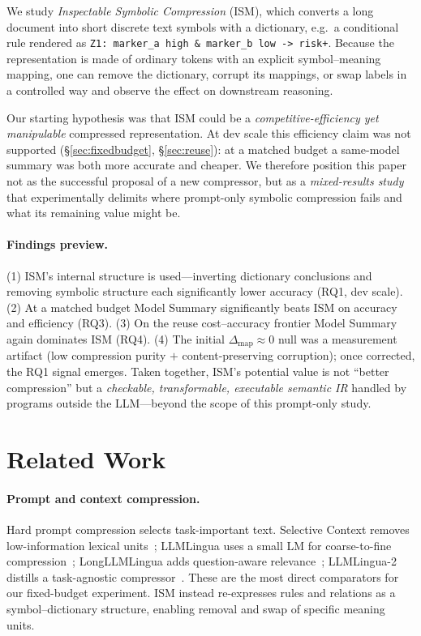 \documentclass{article}
\begin{document}
We study \emph{Inspectable Symbolic Compression} (ISM), which converts a long
document into short discrete text symbols with a dictionary, e.g.\ a conditional
rule rendered as \texttt{Z1: marker\_a high \& marker\_b low -> risk+}. Because
the representation is made of ordinary tokens with an explicit symbol--meaning
mapping, one can remove the dictionary, corrupt its mappings, or swap labels in a
controlled way and observe the effect on downstream reasoning.

Our starting hypothesis was that ISM could be a \emph{competitive-efficiency yet
manipulable} compressed representation. At dev scale this efficiency claim was
not supported (\S\ref{sec:fixedbudget}, \S\ref{sec:reuse}): at a matched budget a
same-model summary was both more accurate and cheaper. We therefore position this
paper not as the successful proposal of a new compressor, but as a
\emph{mixed-results study} that experimentally delimits where prompt-only
symbolic compression fails and what its remaining value might be.

\paragraph{Findings preview.}
(1) ISM's internal structure is used---inverting dictionary conclusions and
removing symbolic structure each significantly lower accuracy (RQ1, dev scale).
(2) At a matched budget Model Summary significantly beats ISM on accuracy and
efficiency (RQ3). (3) On the reuse cost--accuracy frontier Model Summary again
dominates ISM (RQ4). (4) The initial $\Delta_{\mathrm{map}}\approx 0$ null was a
measurement artifact (low compression purity $+$ content-preserving corruption);
once corrected, the RQ1 signal emerges. Taken together, ISM's potential value is
not ``better compression'' but a \emph{checkable, transformable, executable
semantic IR} handled by programs outside the LLM---beyond the scope of this
prompt-only study.

\section{Related Work}
\paragraph{Prompt and context compression.}
Hard prompt compression selects task-important text. Selective Context removes
low-information lexical units~\cite{li2023sc}; LLMLingua uses a small LM for
coarse-to-fine compression~\cite{jiang2023llmlingua}; LongLLMLingua adds
question-aware relevance~\cite{jiang2024longllmlingua}; LLMLingua-2 distills a
task-agnostic compressor~\cite{pan2024llmlingua2}. These are the most direct
comparators for our fixed-budget experiment. ISM instead re-expresses rules and
relations as a symbol--dictionary structure, enabling removal and swap of
specific meaning units.
\end{document}
